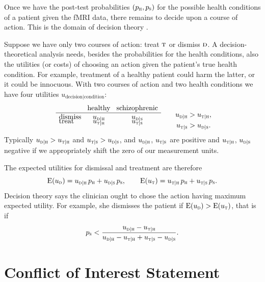 \documentclass[%
]{frontiersSCNS-nologo} %
\newcommand*{\chaps}{chs} %
\renewcommand*{\|}{\mathpunct{|}}%
\newcommand*{\E}{\mathrm{E}}
\DeclarePairedDelimiter\expp{(}{)}
\newcommand*{\expe}{\E\expp}%
\newcommand*{\yhu}{\textsc{h}}
\newcommand*{\yhd}{\textsc{s}}
\newcommand*{\ypth}{p_{\yhu}}
\newcommand*{\ypts}{p_{\yhd}}
\newcommand*{\yT}{\textsc{t}}
\newcommand*{\ynT}{\textsc{d}}
\newcommand*{\yu}{u}
\newcommand*{\yuT}{\yu_{\textsc{t}}}
\newcommand*{\yuD}{\yu_{\textsc{d}}}
\newcommand*{\yudh}{\yu_{\textsc{d}\|\textsc{h}}}
\newcommand*{\yuds}{\yu_{\textsc{d}\|\textsc{s}}}
\newcommand*{\yuth}{\yu_{\textsc{t}\|\textsc{h}}}
\newcommand*{\yuts}{\yu_{\textsc{t}\|\textsc{s}}}
\begin{document}
Once we have the post-test probabilities $(\ypth,\ypts)$ for the possible
health conditions of a patient given the fMRI data, there remains to decide
upon a course of action. This is the domain of decision theory
\citetext{\citealp{raiffaetal1961_r2000}; \citealp[\chaps~13,
  14]{jaynes1994_r2003}; \citealp[\chaps~6, 7]{soxetal1988_r2013}}.

Suppose we have only two courses of action: treat $\yT$ or dismiss $\ynT$.
A decision-theoretical analysis needs, besides the probabilities for the
health conditions, also the utilities (or costs) of choosing an action
given the patient's true health condition. For example, treatment of a
healthy patient could harm the latter, or it could be innocuous. With two
courses of action and two health conditions we have four utilities
$\yu_{\text{decision}\|\text{condition}}$:
\begin{equation}
  \mbox{\setlength{\tabcolsep}{1ex}
  \begin{tabular}{lcc}
    & healthy & schizophrenic\\\hline
    dismiss & $\yudh$ & $\yuds$ \\[-2\jot]
    treat & $\yuth$ & $\yuts$
  \end{tabular}}
\qquad
\begin{aligned}[t]
\yudh&>\yuth,\\ \yuts&>\yuds.
\end{aligned}
  \label{eq:utility_table}
\end{equation}
Typically $\yudh>\yuth$ and $\yuts>\yuds$, and $\yudh$, $\yuts$ are positive
and $\yuth$, $\yuds$ negative if we appropriately shift the zero of our
measurement units.

The expected utilities for dismissal and treatment are therefore
\begin{equation}
  \label{eq:expected_utilities}
    \expe{\yuD} = \yudh\, \ypth + \yuds\, \ypts,
\qquad
    \expe{\yuT} = \yuth\, \ypth + \yuts\, \ypts.
\end{equation}
Decision theory says the clinician ought to chose the action having maximum
expected utility. For example, she dismisses the patient if   $\expe{\yuD}
> \expe{\yuT}$, that is if
\begin{equation}
  \label{eq:dismiss_condition}
\ypts <  \frac{\yudh-\yuth}{\yudh-\yuth+\yuts-\yuds}.
\end{equation}



\section*{Conflict of Interest Statement}
\end{document}
